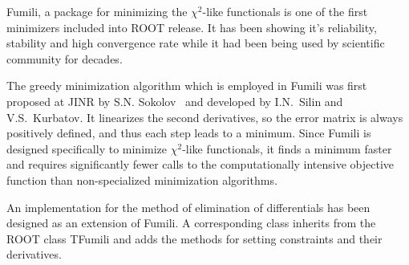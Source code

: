 
Fumili, a package for minimizing the $\chi^2$-like functionals is one of the first minimizers included into ROOT release.
It has been showing it's reliability, stability and high convergence rate while it had been being used by scientific community for decades.

The greedy minimization algorithm which is employed in Fumili was first proposed at JINR by S.N. Sokolov~\cite{fum_1st} and developed by I.N.~Silin and V.S.~Kurbatov.
It linearizes the second derivatives, so the error matrix is always positively defined, and thus each step leads to a minimum.
Since Fumili is designed specifically to minimize $\chi^2$-like functionals, it finds a minimum faster and requires significantly fewer calls to the computationally intensive objective function than non-specialized minimization algorithms.

An implementation for the method of elimination of differentials has been designed as an extension of Fumili.
A corresponding class inherits from the ROOT class TFumili and adds the methods for setting constraints and their derivatives.



%

